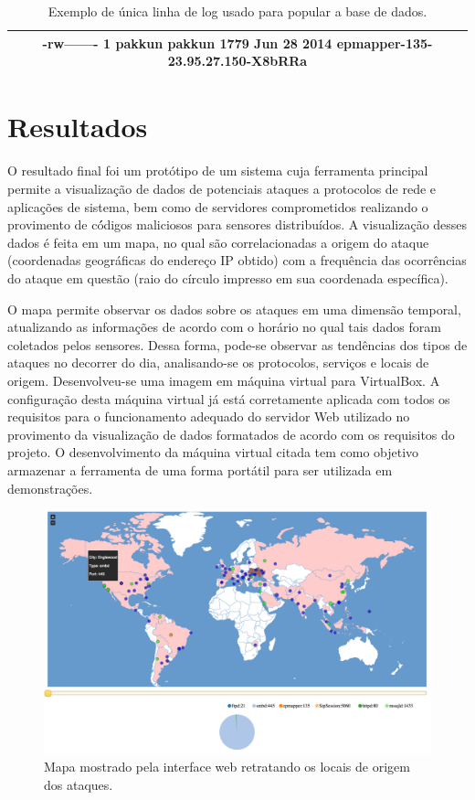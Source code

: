 \documentclass[Portuguese]
{ic-tese-v2}
\begin{document}
\begin{table}
	\center
	\caption{Exemplo de única linha de log usado para popular a base de dados.}
	\label{tab:log}
	\begin{tabular}{|c|}
		\hline
		-rw------- 1 pakkun pakkun  1779 Jun 28  2014 epmapper-135-23.95.27.150-X8bRRa\\
		\hline		
	\end{tabular}
\end{table}

\chapter{Resultados}
O resultado final foi um protótipo de um sistema cuja ferramenta principal permite a visualização de dados de potenciais ataques a protocolos de rede e aplicações de sistema, bem como de servidores comprometidos realizando o provimento de có́digos maliciosos para sensores distribuídos. A visualização desses dados é feita em um mapa, no qual são correlacionadas a origem do ataque (coordenadas geográficas do endereço IP obtido) com a frequência das ocorrências do ataque em questão (raio do círculo impresso em sua coordenada específica).

O mapa permite observar os dados sobre os ataques em uma dimensão temporal, atualizando as informações de acordo com o horário no qual tais dados foram coletados pelos sensores. Dessa forma, pode-se observar as tendências dos tipos de ataques no decorrer do dia, analisando-se os protocolos, serviços e locais de origem.
Desenvolveu-se uma imagem em máquina virtual para VirtualBox. A configuração desta máquina virtual já está corretamente aplicada com todos os requisitos para o funcionamento adequado do servidor Web utilizado no provimento da visualização de dados formatados de acordo com os requisitos do projeto. O desenvolvimento da máquina virtual citada tem como objetivo armazenar a ferramenta de uma forma portátil para ser utilizada em demonstrações. 

\begin{figure}
\center
\includegraphics[width=1\textwidth]{figs/mapa.png}
\caption{Mapa mostrado pela interface web retratando os locais de origem dos ataques.}
\label{mapa}
\end{figure}
\end{document}
